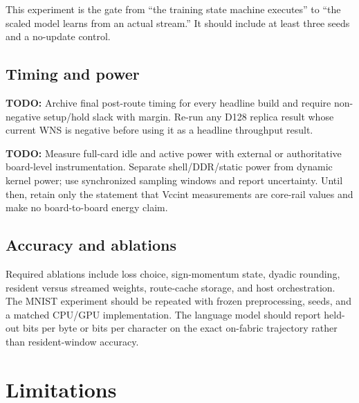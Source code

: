 \documentclass[10pt]{article}
\newcommand{\todo}[1]{\textcolor{red!70!black}{\textbf{TODO:} #1}}
\begin{document}
This experiment is the gate from ``the training state machine executes'' to
``the scaled model learns from an actual stream.''  It should include at least
three seeds and a no-update control.

\subsection{Timing and power}

\todo{Archive final post-route timing for every headline build and require
non-negative setup/hold slack with margin.  Re-run any D128 replica result whose
current WNS is negative before using it as a headline throughput result.}

\todo{Measure full-card idle and active power with external or authoritative
board-level instrumentation.  Separate shell/DDR/static power from dynamic
kernel power; use synchronized sampling windows and report uncertainty.  Until
then, retain only the statement that Vccint measurements are core-rail values
and make no board-to-board energy claim.}

\subsection{Accuracy and ablations}

Required ablations include loss choice, sign-momentum state, dyadic rounding,
resident versus streamed weights, route-cache storage, and host orchestration.
The MNIST experiment should be repeated with frozen preprocessing, seeds, and a
matched CPU/GPU implementation.  The language model should report held-out
bits per byte or bits per character on the exact on-fabric trajectory rather
than resident-window accuracy.

\section{Limitations}
\end{document}
